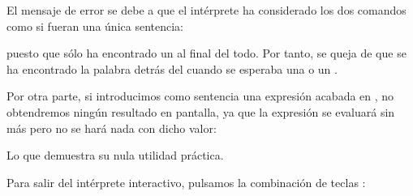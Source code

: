 \documentclass[a4paper,12pt,spanish]{sphinxmanual}
\begin{document}
El mensaje de error se debe a que el intérprete ha considerado los dos comandos
 como si fueran una única sentencia:

%
\begin{sphinxVerbatim}[commandchars=\\\{\}]
   
\end{sphinxVerbatim}

puesto que sólo ha encontrado un \sphinxcode{\sphinxupquote{;}} al final del todo. Por tanto, se queja de
que se ha encontrado la palabra  detrás del  cuando se esperaba
una \sphinxcode{\sphinxupquote{,}} o un \sphinxcode{\sphinxupquote{;}}.

Por otra parte, si introducimos como sentencia una expresión acabada en \sphinxcode{\sphinxupquote{;}},
no obtendremos ningún resultado en pantalla, ya que la expresión se evaluará sin
más pero no se hará nada con dicho valor:

%
\begin{sphinxVerbatim}[commandchars=\\\{\}]
\end{sphinxVerbatim}

Lo que demuestra su nula utilidad práctica.

Para salir del intérprete interactivo, pulsamos la combinación de teclas :

%
\begin{sphinxVerbatim}[commandchars=\\\{\}]
\end{sphinxVerbatim}
\end{document}
